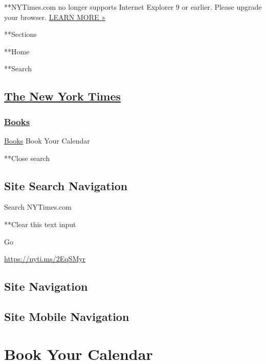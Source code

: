  **NYTimes.com no longer supports Internet Explorer 9 or earlier. Please
upgrade your browser.
\href{http://www.nytimes.com/content/help/site/ie9-support.html}{LEARN
MORE »}

**Sections

**Home

**Search

\hypertarget{the-new-york-times}{%
\subsection{\texorpdfstring{\href{http://www.nytimes.com/}{The New York
Times}}{The New York Times}}\label{the-new-york-times}}

\hypertarget{-books-}{%
\subsubsection{\texorpdfstring{
\href{https://www.nytimes.com/section/books}{Books}
}{ Books }}\label{-books-}}

 \href{https://www.nytimes.com/section/books}{Books} \textbar{}Book Your
Calendar

**Close search

\hypertarget{site-search-navigation}{%
\subsection{Site Search Navigation}\label{site-search-navigation}}

Search NYTimes.com

**Clear this text input

Go

\url{https://nyti.ms/2EqSMyr}

\hypertarget{site-navigation}{%
\subsection{Site Navigation}\label{site-navigation}}

\hypertarget{site-mobile-navigation}{%
\subsection{Site Mobile Navigation}\label{site-mobile-navigation}}

\hypertarget{book-your-calendar}{%
\section{Book Your Calendar}\label{book-your-calendar}}

